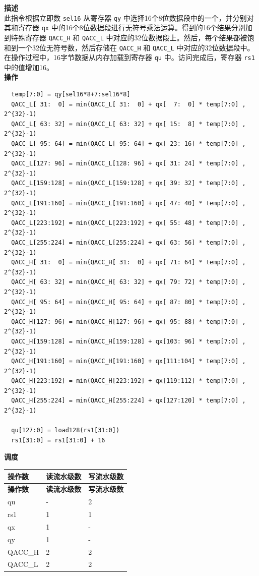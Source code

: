 \textbf{描述}\\
此指令根据立即数 \lstinline{sel16} 从寄存器 \lstinline{qy} 中选择16个8位数据段中的一个，并分别对其和寄存器 \lstinline{qx} 中的16个8位数据段进行无符号乘法运算。得到的16个结果分别加到特殊寄存器 \lstinline{QACC_H} 和 \lstinline{QACC_L} 中对应的32位数据段上。然后，每个结果都被饱和到一个32位无符号数，然后存储在 \lstinline{QACC_H} 和 \lstinline{QACC_L} 中对应的32位数据段中。\\
在操作过程中，16字节数据从内存加载到寄存器 \lstinline{qu} 中。访问完成后，寄存器 \lstinline{rs1} 中的值增加16。\\
\textbf{操作}
\begin{lstlisting}
  temp[7:0] = qy[sel16*8+7:sel16*8]
  QACC_L[ 31:  0] = min(QACC_L[ 31:  0] + qx[  7:  0] * temp[7:0] , 2^{32}-1)
  QACC_L[ 63: 32] = min(QACC_L[ 63: 32] + qx[ 15:  8] * temp[7:0] , 2^{32}-1)
  QACC_L[ 95: 64] = min(QACC_L[ 95: 64] + qx[ 23: 16] * temp[7:0] , 2^{32}-1)
  QACC_L[127: 96] = min(QACC_L[128: 96] + qx[ 31: 24] * temp[7:0] , 2^{32}-1)
  QACC_L[159:128] = min(QACC_L[159:128] + qx[ 39: 32] * temp[7:0] , 2^{32}-1)
  QACC_L[191:160] = min(QACC_L[191:160] + qx[ 47: 40] * temp[7:0] , 2^{32}-1)
  QACC_L[223:192] = min(QACC_L[223:192] + qx[ 55: 48] * temp[7:0] , 2^{32}-1)
  QACC_L[255:224] = min(QACC_L[255:224] + qx[ 63: 56] * temp[7:0] , 2^{32}-1)
  QACC_H[ 31:  0] = min(QACC_H[ 31:  0] + qx[ 71: 64] * temp[7:0] , 2^{32}-1)
  QACC_H[ 63: 32] = min(QACC_H[ 63: 32] + qx[ 79: 72] * temp[7:0] , 2^{32}-1)
  QACC_H[ 95: 64] = min(QACC_H[ 95: 64] + qx[ 87: 80] * temp[7:0] , 2^{32}-1)
  QACC_H[127: 96] = min(QACC_H[127: 96] + qx[ 95: 88] * temp[7:0] , 2^{32}-1)
  QACC_H[159:128] = min(QACC_H[159:128] + qx[103: 96] * temp[7:0] , 2^{32}-1)
  QACC_H[191:160] = min(QACC_H[191:160] + qx[111:104] * temp[7:0] , 2^{32}-1)
  QACC_H[223:192] = min(QACC_H[223:192] + qx[119:112] * temp[7:0] , 2^{32}-1)
  QACC_H[255:224] = min(QACC_H[255:224] + qx[127:120] * temp[7:0] , 2^{32}-1)

  qu[127:0] = load128(rs1[31:0])
  rs1[31:0] = rs1[31:0] + 16
\end{lstlisting}

\textbf{调度}\\
\begin{longtable}[c]{|l|l|l|}
    \hline
    \rowcolor{lightgray}
    \textbf{操作数} & \textbf{读流水级数} & \textbf{写流水级数} \\\hline
    \endfirsthead
    \hline
    \rowcolor{lightgray}
     \textbf{操作数} & \textbf{读流水级数} & \textbf{写流水级数} \\\hline
    \endhead
    \hline
    \endfoot

    qu & - & 2 \\\hline
    rs1 & 1 & 1 \\\hline
     qx & 1 & - \\\hline
     qy & 1 & - \\\hline
     QACC\_H & 2 & 2 \\\hline
     QACC\_L & 2 & 2

\end{longtable}


